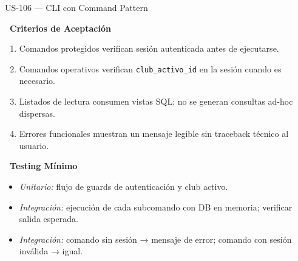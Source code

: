 \documentclass[11pt,a4paper]{article}
\newcommand{\fpath}[1]{\texttt{\small #1}}
\newcommand{\usfield}[2][\;]{%
  \par\vspace{5pt}%
  {\small\textbf{\textcolor{primary}{#2}}}\par\vspace{2pt}%
}
\begin{document}
\begin{uscard}{US-106 — CLI con Command Pattern}
\usfield{\faCheckCircle\ Criterios de Aceptación}
\begin{enumerate}[label=\textcolor{accent}{\textbf{AC\arabic*.}}, nosep, leftmargin=2.2em]
  \item Comandos protegidos verifican sesión autenticada antes de ejecutarse.
  \item Comandos operativos verifican \fpath{club\_activo\_id} en la sesión cuando es necesario.
  \item Listados de lectura consumen vistas SQL; no se generan consultas ad-hoc dispersas.
  \item Errores funcionales muestran un mensaje legible sin traceback técnico al usuario.
\end{enumerate}

\usfield{\faFlask\ Testing Mínimo}
\begin{itemize}[nosep, leftmargin=1.6em]
  \item \textit{Unitario:} flujo de guards de autenticación y club activo.
  \item \textit{Integración:} ejecución de cada subcomando con DB en memoria; verificar salida esperada.
  \item \textit{Integración:} comando sin sesión → mensaje de error; comando con sesión inválida → igual.
\end{itemize}

\end{uscard}
\end{document}
